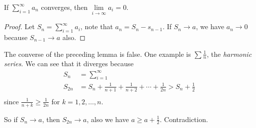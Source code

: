 \begin{lemma}{}{}
    If \(\sum\limits_{i=1}^{\infty} a_n\) converges, then \(\lim\limits_{i \to \infty} a_i = 0\).
\end{lemma}
\begin{proof}
    Let \(S_n = \sum\limits_{i=1}^{\infty} a_i\), note that \(a_n = S_n - s_{n-1}\). If \(S_n \to a\), we have \(a_n \to  0\) because \(S_{n-1} \to  a\) also.
\end{proof}
\begin{remark}
    The converse of the preceding lemma is false. One example is \(\sum \frac{1}{n}\), the \textit{harmonic series}. We can see that it diverges because
    \begin{align*}
        S_n &= \sum\limits_{i=1}^{\infty}\\
        S_{2n} &= S_n + \frac{1}{n + 1} + \frac{1}{n+2}+\cdots + \frac{1}{2n}>S_n + \frac{1}{2}\\
    \end{align*}
    since \(\frac{1}{n+k}\geq \frac{1}{2n}\) for \(k=1,2, \ldots ,n \).

    So if \(S_n \to a\), then \(S_{2n}\to a\), also we have \(a\geq a+\frac{1}{2}\). Contradiction.
\end{remark}
